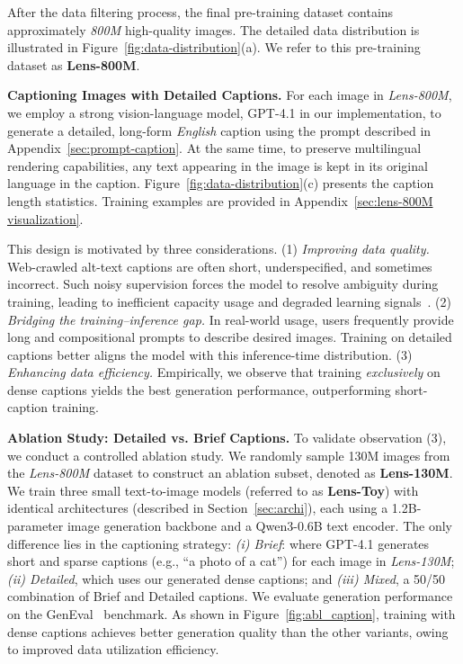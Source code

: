 After the data filtering process, the final pre-training dataset contains approximately \textit{800M} high-quality images. The detailed data distribution is illustrated in Figure~\ref{fig:data-distribution}(a). We refer to this pre-training dataset as \textbf{Lens-800M}.








\noindent\textbf{Captioning Images with Detailed Captions.}
For each image in \textit{Lens-800M}, we employ a strong vision-language model, GPT-4.1 in our implementation, to generate a detailed, long-form \textit{English} caption using the prompt described in Appendix~\ref{sec:prompt-caption}. At the same time, to preserve multilingual rendering capabilities, any text appearing in the image is kept in its original language in the caption. Figure~\ref{fig:data-distribution}(c) presents the caption length statistics. Training examples are provided in Appendix~\ref{sec:lens-800M visualization}.




This design is motivated by three considerations.
(1) \textit{Improving data quality.} Web-crawled alt-text captions are often short, underspecified, and sometimes incorrect. Such noisy supervision forces the model to resolve ambiguity during training, leading to inefficient capacity usage and degraded learning signals~\citep{betker2023improving,chen2024sharegpt4v}.
(2) \textit{Bridging the training–inference gap.} In real-world usage, users frequently provide long and compositional prompts to describe desired images. Training on detailed captions better aligns the model with this inference-time distribution.
(3) \textit{Enhancing data efficiency.} Empirically, we observe that training \emph{exclusively} on dense captions yields the best generation performance, outperforming short-caption training.

\noindent\textbf{Ablation Study: Detailed vs. Brief Captions.}
To validate observation (3), we conduct a controlled ablation study. We randomly sample 130M images from the \textit{Lens-800M} dataset to construct an ablation subset, denoted as \textbf{Lens-130M}. We train three small text-to-image models (referred to as \textbf{Lens-Toy}) with identical architectures (described in Section~\ref{sec:archi}), each using a 1.2B-parameter image generation backbone and a Qwen3-0.6B text encoder. The only difference lies in the captioning strategy:
\textit{(i) Brief}: where GPT-4.1 generates short and sparse captions (e.g., ``a photo of a cat'') for each image in \textit{Lens-130M};
\textit{(ii) Detailed}, which uses our generated dense captions; and \textit{(iii) Mixed}, a 50/50 combination of Brief and Detailed captions. We evaluate generation performance on the GenEval~\citep{ghosh2023geneval} benchmark. As shown in Figure~\ref{fig:abl_caption}, training with dense captions achieves better generation quality than the other variants, owing to improved data utilization efficiency.
 


